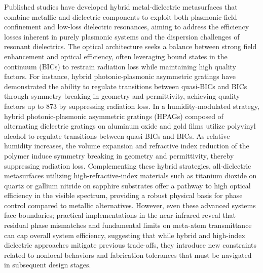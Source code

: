 Published studies have developed hybrid metal-dielectric metasurfaces that combine metallic and dielectric components to exploit both plasmonic field confinement and low-loss dielectric resonances, aiming to address the efficiency losses inherent in purely plasmonic systems and the dispersion challenges of resonant dielectrics. The optical architecture seeks a balance between strong field enhancement and optical efficiency, often leveraging bound states in the continuum (BICs) to restrain radiation loss while maintaining high quality factors. For instance, hybrid photonic-plasmonic asymmetric gratings have demonstrated the ability to regulate transitions between quasi-BICs and BICs through symmetry breaking in geometry and permittivity, achieving quality factors up to 873 by suppressing radiation loss. In a humidity-modulated strategy, hybrid photonic-plasmonic asymmetric gratings (HPAGs) composed of alternating dielectric gratings on aluminum oxide and gold films utilize polyvinyl alcohol to regulate transitions between quasi-BICs and BICs. As relative humidity increases, the volume expansion and refractive index reduction of the polymer induce symmetry breaking in geometry and permittivity, thereby suppressing radiation loss. \citep{doi_10_1002_adpr_202400191_88f03cd9} Complementing these hybrid strategies, all-dielectric metasurfaces utilizing high-refractive-index materials such as titanium dioxide on quartz or gallium nitride on sapphire substrates offer a pathway to high optical efficiency in the visible spectrum, providing a robust physical basis for phase control compared to metallic alternatives. However, even these advanced systems face boundaries; practical implementations in the near-infrared reveal that residual phase mismatches and fundamental limits on meta-atom transmittance can cap overall system efficiency, suggesting that while hybrid and high-index dielectric approaches mitigate previous trade-offs, they introduce new constraints related to nonlocal behaviors and fabrication tolerances that must be navigated in subsequent design stages. \citep{doi_10_1002_adpr_202400191_88f03cd9} \citep{doi_10_1063_5_0141881_93942631}

